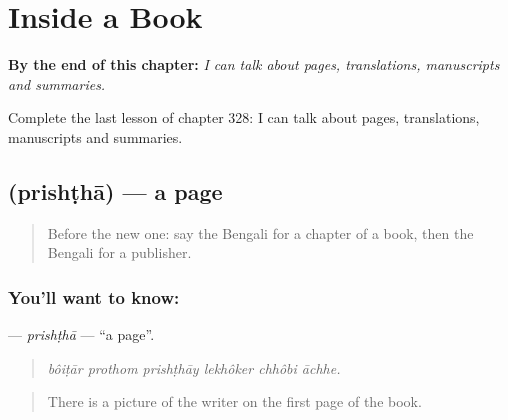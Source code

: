 
\chapter{Inside a Book}
\label{ch:bn-inside-a-book}

\begin{chapteropening}
\textbf{By the end of this chapter:} \emph{I can talk about pages, translations, manuscripts and summaries.}

Complete the last lesson of chapter 328: I can talk about pages, translations, manuscripts and summaries.
\end{chapteropening}

\section[\texorpdfstring{\bn{পৃষ্ঠা} (prishṭhā)}{পৃষ্ঠা (prishṭhā)}]{ (prishṭhā) — a page}

\label{lesson:BN-C328-prishtha}



\begin{quote}
Before the new one: say the Bengali for a chapter of a book, then the Bengali for a publisher.
\end{quote}

\subsection*{You'll want to know: }
\textbf{} — \emph{prishṭhā} — \textquotedblleft{}a page\textquotedblright{}.

\begin{quote}
     
\end{quote}

\begin{quote}
\emph{bôiṭār prothom prishṭhāy lekhôker chhôbi āchhe.}
\end{quote}

\begin{quote}
There is a picture of the writer on the first page of the book.
\end{quote}

